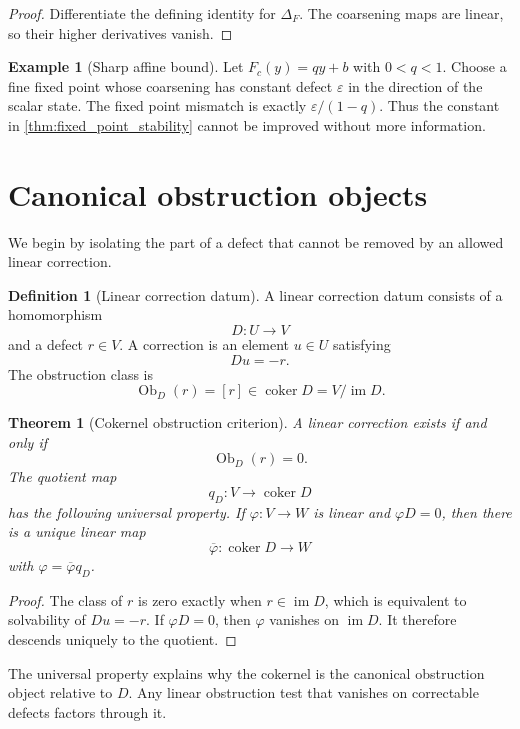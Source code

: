 \documentclass[11pt,a4paper]{article}
\newtheorem{theorem}{Theorem}[section]
\theoremstyle{plain}
\theoremstyle{definition}
\newtheorem{definition}[definition]{Definition}
\newtheorem{example}[example]{Example}
\theoremstyle{remark}
\newcommand{\im}{\operatorname{im}}
\newcommand{\Ob}{\operatorname{Ob}}
\newcommand{\coker}{\operatorname{coker}}
\begin{document}
\begin{proof}
Differentiate the defining identity for $\Delta_F$.  The coarsening maps are linear, so their higher derivatives vanish.
\end{proof}

\begin{example}[Sharp affine bound]\label{ex:sharp_affine_bound}
Let $F_c(y)=qy+b$ with $0<q<1$.  Choose a fine fixed point whose coarsening has constant defect $\varepsilon$ in the direction of the scalar state.  The fixed point mismatch is exactly $\varepsilon/(1-q)$.  Thus the constant in \cref{thm:fixed_point_stability} cannot be improved without more information.
\end{example}

\section{Canonical obstruction objects}\label{sec:obstruction_objects}

We begin by isolating the part of a defect that cannot be removed by an allowed linear correction.

\begin{definition}[Linear correction datum]\label{def:linear_correction_datum}
A linear correction datum consists of a homomorphism
\[
D:U\longrightarrow V
\]
and a defect $r\in V$.  A correction is an element $u\in U$ satisfying
\[
Du=-r.
\]
The obstruction class is
\[
\Ob_D(r)=[r]\in\coker D=V/\im D.
\]
\end{definition}

\begin{theorem}[Cokernel obstruction criterion]\label{thm:cokernel_obstruction}
A linear correction exists if and only if
\[
\Ob_D(r)=0.
\]
The quotient map
\[
q_D:V\longrightarrow\coker D
\]
has the following universal property.  If $\varphi:V\to W$ is linear and $\varphi D=0$, then there is a unique linear map
\[
\overline\varphi:\coker D\longrightarrow W
\]
with $\varphi=\overline\varphi q_D$.
\end{theorem}

\begin{proof}
The class of $r$ is zero exactly when $r\in\im D$, which is equivalent to solvability of $Du=-r$.  If $\varphi D=0$, then $\varphi$ vanishes on $\im D$.  It therefore descends uniquely to the quotient.
\end{proof}

The universal property explains why the cokernel is the canonical obstruction object relative to $D$.  Any linear obstruction test that vanishes on correctable defects factors through it.
\end{document}
